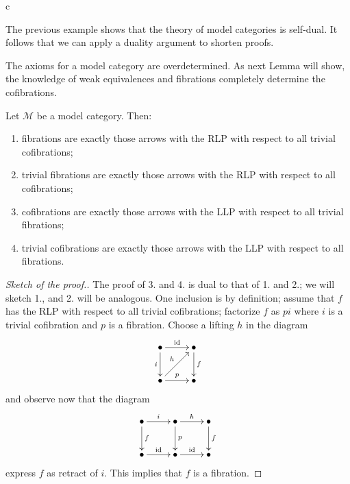 \begin{refsection}
\begin{eg} \label{eg model structure overcategories}
c %
\end{eg}

\begin{rmk}
The previous example shows that the theory of model categories is self-dual. It follows that we can apply a duality argument to shorten proofs.
\end{rmk}

\begin{rmk}
The axioms for a model category are overdetermined. As next Lemma will show, the knowledge of weak equivalences and fibrations completely determine the cofibrations.
\end{rmk}

\begin{lemma}
Let $\mathcal M$ be a model category. Then:
\begin{enumerate}
\item fibrations are exactly those arrows with the RLP with respect to all trivial cofibrations;
\item trivial fibrations are exactly those arrows with the RLP with respect to all cofibrations;
\item cofibrations are exactly those arrows with the LLP with respect to all trivial fibrations;
\item trivial cofibrations are exactly those arrows with the LLP with respect to all fibrations.
\end{enumerate}
\end{lemma}

\begin{proof}[Sketch of the proof.]
The proof of 3. and 4. is dual to that of 1. and 2.; we will sketch 1., and 2. will be analogous. One inclusion is by definition; assume that $f$ has the RLP with respect to all trivial cofibrations; factorize $f$ as $pi$ where $i$ is a trivial cofibration and $p$ is a fibration. Choose a lifting $h$ in the diagram
\[
\xymatrix{
\bullet \ar[r]^{\mathrm{id}} \ar[d]_i & \bullet \ar[d]^f \\ \bullet \ar[r]^p \ar[ur]^h & \bullet
}
\]
and observe now that the diagram
\[
\xymatrix{
\bullet \ar[r]^i \ar[d]^f & \bullet \ar[d]^p \ar[r]^h & \bullet \ar[d]^f \\ \bullet \ar[r]^{\mathrm{id}} & \bullet \ar[r]^{\mathrm{id}} & \bullet
}
\]
express $f$ as retract of $i$. This implies that $f$ is a fibration.
\end{proof}


\end{refsection}

